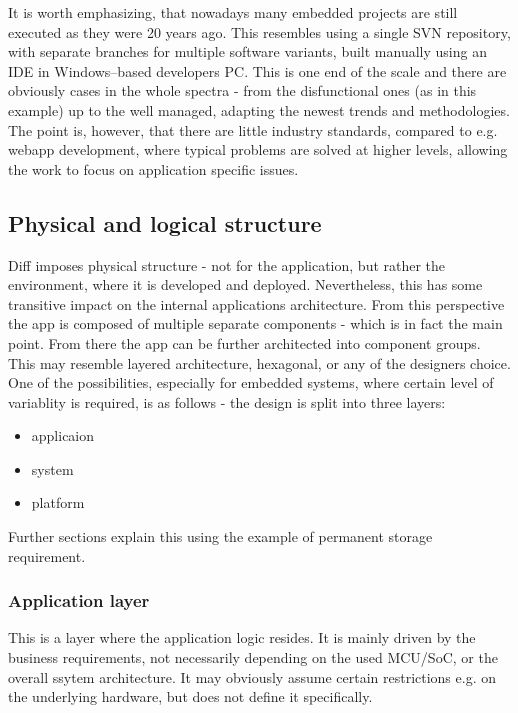 \documentclass[preprint,12pt, a4paper]{elsarticle}
\begin{document}
It is worth emphasizing, that nowadays many embedded projects are still executed as they were 20 years ago. This resembles using a single SVN repository, with separate branches for multiple software variants, built manually using an IDE in Windows--based developers PC. This is one end of the scale and there are obviously cases in the whole spectra - from the disfunctional ones (as in this example) up to the well managed, adapting the newest trends and methodologies. The point is, however, that there are little industry standards, compared to e.g. webapp development, where typical problems are solved at higher levels, allowing the work to focus on application specific issues.

\subsection{Physical and logical structure}
Diff imposes physical structure - not for the application, but rather the environment, where it is developed and deployed. Nevertheless, this has some transitive impact on the internal applications architecture. From this perspective the app is composed of multiple separate components - which is in fact the main point. From there the app can be further architected into component groups. This may resemble layered architecture, hexagonal, or any of the designers choice. One of the possibilities, especially for embedded systems, where certain level of variablity is required, is as follows - the design is split into three layers:
\begin{itemize}
    \item applicaion
    \item system
    \item platform
\end{itemize}


Further sections explain this using the example of permanent storage requirement.

\subsubsection{Application layer}
This is a layer where the application logic resides. It is mainly driven by the business requirements, not necessarily depending on the used MCU/SoC, or the overall ssytem architecture. It may obviously assume certain restrictions e.g. on the underlying hardware, but does not define it specifically.
\end{document}
